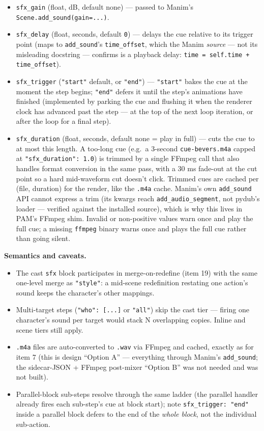 \documentclass[
  11pt,
]{book}
\begin{document}
\begin{itemize}
\item
  \texttt{sfx\_gain} (float, dB, default none) --- passed to Manim's
  \texttt{Scene.add\_sound(gain=...)}.
\item
  \texttt{sfx\_delay} (float, seconds, default \texttt{0}) --- delays
  the cue relative to its trigger point (maps to \texttt{add\_sound}'s
  \texttt{time\_offset}, which the Manim \emph{source} --- not its
  misleading docstring --- confirms is a playback delay:
  \texttt{time = self.time + time\_offset}).
\item
  \texttt{sfx\_trigger} (\texttt{"start"} default, or \texttt{"end"})
  --- \texttt{"start"} bakes the cue at the moment the step begins;
  \texttt{"end"} defers it until the step's animations have finished
  (implemented by parking the cue and flushing it when the renderer
  clock has advanced past the step --- at the top of the next loop
  iteration, or after the loop for a final step).
\item
  \texttt{sfx\_duration} (float, seconds, default none = play in
  full) --- cuts the cue to at most this length. A too-long cue
  (e.g.\ a 3-second \texttt{cue-bevers.m4a} capped at
  \texttt{"sfx\_duration": 1.0}) is trimmed by a single FFmpeg call
  that also handles format conversion in the same pass, with a 30 ms
  fade-out at the cut point so a hard mid-waveform cut doesn't click.
  Trimmed cues are cached per (file, duration) for the render, like
  the \texttt{.m4a} cache. Manim's own \texttt{add\_sound} API cannot
  express a trim (its kwargs reach \texttt{add\_audio\_segment}, not
  pydub's loader --- verified against the installed source), which is
  why this lives in PAM's FFmpeg shim. Invalid or non-positive values
  warn once and play the full cue; a missing \texttt{ffmpeg} binary
  warns once and plays the full cue rather than going silent.
\end{itemize}

\textbf{Semantics and caveats.}

\begin{itemize}
\item
  The cast \texttt{sfx} block participates in merge-on-redefine
  (item 19) with the same one-level merge as \texttt{"style"}: a
  mid-scene redefinition restating one action's sound keeps the
  character's other mappings.
\item
  Multi-target steps (\texttt{"who": [...]} or \texttt{"all"}) skip
  the cast tier --- firing one character's sound per target would
  stack N overlapping copies. Inline and scene tiers still apply.
\item
  \texttt{.m4a} files are auto-converted to \texttt{.wav} via FFmpeg
  and cached, exactly as for item 7 (this is design ``Option A'' ---
  everything through Manim's \texttt{add\_sound}; the sidecar-JSON +
  FFmpeg post-mixer ``Option B'' was not needed and was not built).
\item
  Parallel-block sub-steps resolve through the same ladder (the
  parallel handler already fires each sub-step's cue at block start);
  note \texttt{sfx\_trigger: "end"} inside a parallel block defers to
  the end of the \emph{whole block}, not the individual sub-action.
\end{itemize}
\end{document}

